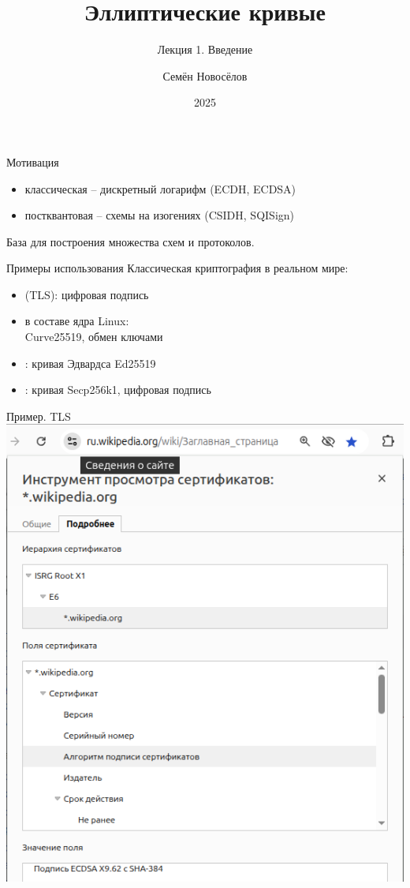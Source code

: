 \documentclass{beamer}
\title{Эллиптические кривые}
\subtitle{Лекция 1. Введение}
\author{Семён Новосёлов}
\institute{БФУ им. И. Канта}
\date{2025}
\begin{document}
    

\frame{\titlepage}

\begin{frame}{Мотивация}

    \begin{itemize}
        \item классическая -- дискретный логарифм (ECDH, ECDSA)
        \item постквантовая -- схемы на изогениях (CSIDH, SQISign)
    \end{itemize}
    
    \vspace{1em}
    
    База для построения множества схем и протоколов.
\end{frame}

\begin{frame}{Примеры использования}
Классическая криптография в реальном мире:
\vspace{0.5em}
\begin{itemize}
	\item {} (TLS): цифровая подпись
	\item {} в составе ядра Linux:
	\\Curve25519, обмен ключами
	\item {}: кривая Эдвардса Ed25519
	\item {}: кривая Secp256k1, цифровая подпись
\end{itemize}
\end{frame}

\begin{frame}{Пример. TLS}
\includegraphics[scale=0.35]{../images/example_tls}
\end{frame}
\end{document}
